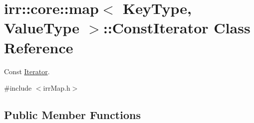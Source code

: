 \hypertarget{classirr_1_1core_1_1map_1_1ConstIterator}{}\section{irr\+:\+:core\+:\+:map$<$ Key\+Type, Value\+Type $>$\+:\+:Const\+Iterator Class Reference}
\label{classirr_1_1core_1_1map_1_1ConstIterator}


Const \hyperlink{classirr_1_1core_1_1map_1_1Iterator}{Iterator}.  




{\ttfamily \#include $<$irr\+Map.\+h$>$}

\subsection*{Public Member Functions}
